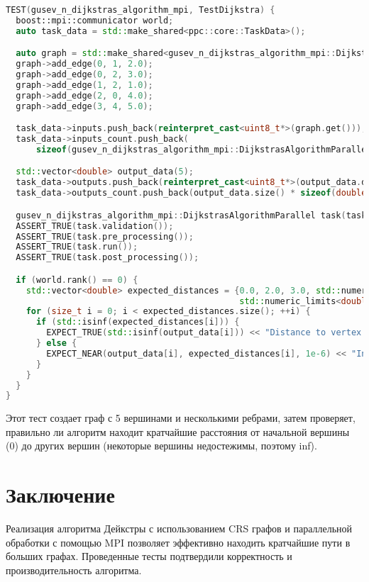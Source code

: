 \documentclass[12pt]{article}
\begin{document}
\begin{lstlisting}[language=c++, caption={Пример функционального теста}]
TEST(gusev_n_dijkstras_algorithm_mpi, TestDijkstra) {
  boost::mpi::communicator world;
  auto task_data = std::make_shared<ppc::core::TaskData>();

  auto graph = std::make_shared<gusev_n_dijkstras_algorithm_mpi::DijkstrasAlgorithmParallel::SparseGraphCRS>(5);
  graph->add_edge(0, 1, 2.0);
  graph->add_edge(0, 2, 3.0);
  graph->add_edge(1, 2, 1.0);
  graph->add_edge(2, 0, 4.0);
  graph->add_edge(3, 4, 5.0);

  task_data->inputs.push_back(reinterpret_cast<uint8_t*>(graph.get()));
  task_data->inputs_count.push_back(
      sizeof(gusev_n_dijkstras_algorithm_mpi::DijkstrasAlgorithmParallel::SparseGraphCRS));

  std::vector<double> output_data(5);
  task_data->outputs.push_back(reinterpret_cast<uint8_t*>(output_data.data()));
  task_data->outputs_count.push_back(output_data.size() * sizeof(double));

  gusev_n_dijkstras_algorithm_mpi::DijkstrasAlgorithmParallel task(task_data);
  ASSERT_TRUE(task.validation());
  ASSERT_TRUE(task.pre_processing());
  ASSERT_TRUE(task.run());
  ASSERT_TRUE(task.post_processing());

  if (world.rank() == 0) {
    std::vector<double> expected_distances = {0.0, 2.0, 3.0, std::numeric_limits<double>::infinity(),
                                              std::numeric_limits<double>::infinity()};
    for (size_t i = 0; i < expected_distances.size(); ++i) {
      if (std::isinf(expected_distances[i])) {
        EXPECT_TRUE(std::isinf(output_data[i])) << "Distance to vertex " << i << " should be infinity";
      } else {
        EXPECT_NEAR(output_data[i], expected_distances[i], 1e-6) << "Incorrect distance to vertex " << i;
      }
    }
  }
}
\end{lstlisting}
Этот тест создает граф с 5 вершинами и несколькими ребрами, затем проверяет, правильно ли алгоритм находит кратчайшие расстояния от начальной вершины (0) до других вершин (некоторые вершины недостежимы, поэтому inf).
\newpage
\section{Заключение}
Реализация алгоритма Дейкстры с использованием CRS графов и параллельной обработки с помощью MPI позволяет эффективно находить кратчайшие пути в больших графах. Проведенные тесты подтвердили корректность и производительность алгоритма.
\end{document}
